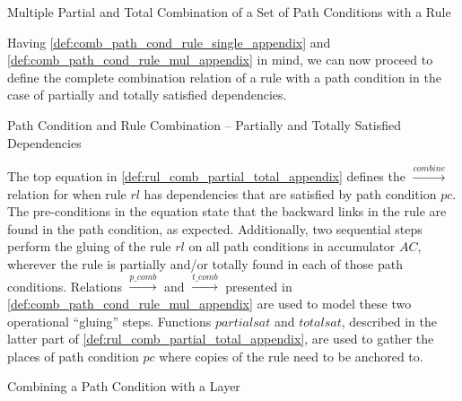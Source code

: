\begin{definition}{Multiple Partial and Total Combination of a Set of Path Conditions with a Rule\\}
\label{def:comb_path_cond_rule_mul_appendix}
\end{definition}

Having \cref{def:comb_path_cond_rule_single_appendix} and \cref{def:comb_path_cond_rule_mul_appendix} in mind, we can now proceed to define the complete combination relation of a rule with a path condition in the case of partially and totally satisfied dependencies. 

\begin{definition}{Path Condition and Rule Combination -- Partially and Totally Satisfied Dependencies\\}
\label{def:rul_comb_partial_total_appendix}
\end{definition}

The top equation in \cref{def:rul_comb_partial_total_appendix} defines the $\stackrel{combine}{\rightarrow}$ relation for when rule $rl$ has dependencies that are satisfied by path condition $pc$. The pre-conditions in the equation state that the backward links in the rule are found in the path condition, as expected. Additionally, two sequential steps perform the gluing of the rule $rl$ on all path conditions in accumulator $AC$, wherever the rule is partially and/or totally found in each of those path conditions. Relations $\stackrel{p\_comb}{\rightarrow}$ and $\stackrel{t\_comb}{\rightarrow}$ presented in \cref{def:comb_path_cond_rule_mul_appendix} are used to model these two operational ``gluing'' steps. Functions $partialsat$ and $totalsat$, described in the latter part of \cref{def:rul_comb_partial_total_appendix}, are used to gather the places of path condition $pc$ where copies of the rule need to be anchored to.

\begin{definition} {Combining a Path Condition with a Layer\\}
\label{def:path_cond_layer_comb_appendix}
\end{definition}


